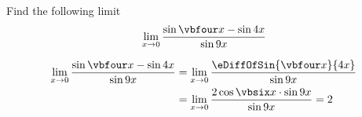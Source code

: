 



\MULTIPLY{}\vbthree
\ADD\vbthree\vbtwo\vbfour
\ADD\vbfour\vbtwo\vbfive
\DIVIDE{}\vbsix

\question Find the following limit \[ \lim_{x\to 0}\dfrac{\sin\vbfour x - \sin\vbtwo x}{\sin\vbone x}\]

\watchout[-40pt]

\begin{solution}
  \begin{align}
    \lim_{x\to 0}\dfrac{\sin\vbfour x - \sin\vbtwo x}{\sin\vbone x} &=
    \lim_{x\to 0}\dfrac{\eDiffOfSin{\vbfour x}{\vbtwo x}}{\sin\vbone x} \\
    &= \lim_{x\to 0}\dfrac{2\cos\vbsix x\cdot\sin\vbone x}{\sin\vbone x} = 2
  \end{align}
\end{solution}

